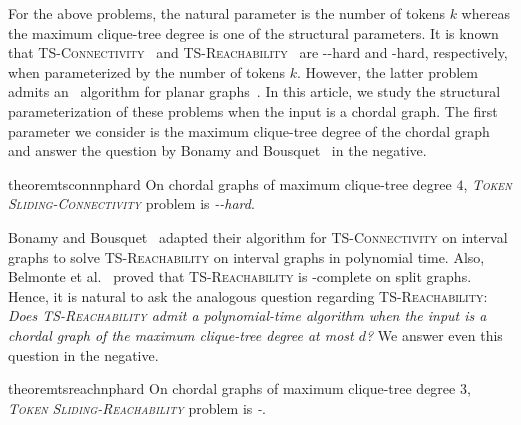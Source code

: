 For the above problems, the natural parameter is the number of tokens $k$
whereas the maximum clique-tree degree 
is one of the structural parameters. 
It is known that \textsc{TS-Connectivity}~\cite{DBLP:conf/wg/BonamyB17}
and \textsc{TS-Reachability}~\cite{DBLP:conf/tamc/ItoKOSUY14} are \co-\W[2]-hard and
\W[1]-hard, respectively, when parameterized by the number of tokens $k$.
However, the latter problem admits an \FPT~algorithm for planar graphs~\cite{DBLP:conf/isaac/ItoKO14}.
In this article, we study the structural parameterization
of these problems when the input is a chordal graph.
The first parameter we consider is the maximum clique-tree
degree of the chordal graph and answer the question by 
Bonamy and Bousquet~\cite{DBLP:conf/wg/BonamyB17}
in the negative.

\begin{restatable}{theorem}{tsconnnphard}
\label{thm:np-hardness-clique-tree-degree-TS-Conn}
On chordal graphs of maximum clique-tree degree $4$,
\emph{\textsc{Token Sliding-Connectivity}} problem is 
\emph{\co-\NP-hard}.
\end{restatable} 

Bonamy and Bousquet~\cite{DBLP:conf/wg/BonamyB17} 
adapted their algorithm for \textsc{TS-Connectivity} on interval graphs
to solve \textsc{TS-Reachability} on interval graphs in polynomial time.
Also, Belmonte et al.~\cite{DBLP:journals/mst/BelmonteKLMOS21} 
proved that \textsc{TS-Reachability} is \PSPACE-complete on split graphs.
Hence, it is natural to ask the analogous question regarding
\textsc{TS-Reachability}: 
\emph{Does \emph{\textsc{TS-Reachability}} admit a 
polynomial-time algorithm when the input is a chordal graph 
of the maximum clique-tree degree at most $d$?}
We answer even this question in the negative.

\begin{restatable}{theorem}{tsreachnphard}
\label{thm:np-hardness-clique-tree-degree-TS-Reach}
On chordal graphs of maximum clique-tree degree $3$,
\emph{\textsc{Token Sliding-Reachability}} problem is 
\emph{\NP-\hard}.
\end{restatable}

